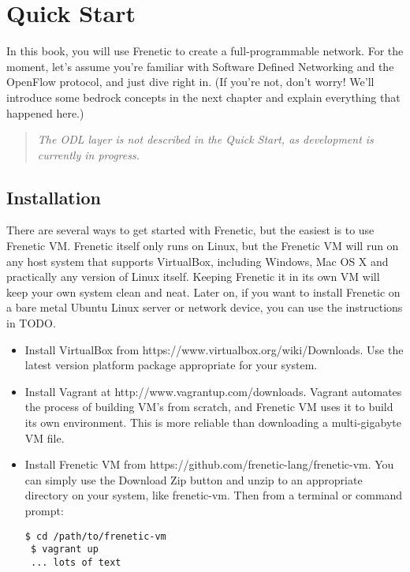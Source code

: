 \chapter{Quick Start}

In this book, you will use Frenetic to create a full-programmable network.  For the moment, let's assume you're familiar with Software Defined Networking and the OpenFlow protocol, and just dive right in.  (If you're not, don't worry!  We'll introduce some bedrock concepts in the next chapter and explain everything that happened here.)  

\begin{quotation}
{\it The ODL layer is not described in the Quick Start, as development is currently in progress.  }
\end{quotation}

\section{Installation}

There are several ways to get started with Frenetic, but the easiest is to use Frenetic VM.  Frenetic itself only runs on Linux, but the Frenetic VM will run on any host system that supports VirtualBox, including Windows, Mac OS X and practically any version of Linux itself.   Keeping Frenetic it in its own VM will keep your own system clean and neat.  Later on, if you want to install Frenetic on a bare metal Ubuntu Linux server or network device, you can use the instructions in TODO.  

\begin{itemize}
\item Install VirtualBox from https://www.virtualbox.org/wiki/Downloads.  Use the latest version platform package appropriate for your system.  
\item Install Vagrant at http://www.vagrantup.com/downloads.  Vagrant automates the process of building VM's from scratch, and Frenetic VM uses it to build its own environment.  This is more reliable than downloading a multi-gigabyte VM file.   
\item Install Frenetic VM from https://github.com/frenetic-lang/frenetic-vm.  You can simply use the Download Zip button and unzip to an appropriate directory on your system, like frenetic-vm.  Then from a terminal or command prompt:
\\
\begin{lstlisting}[style=BashInputStyle]
 $ cd /path/to/frenetic-vm
 $ vagrant up
 ... lots of text 
\end{lstlisting}
\end{itemize}


